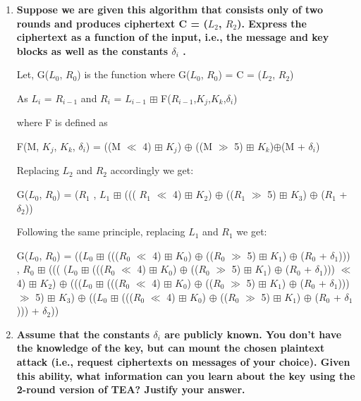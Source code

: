 \documentclass{article}
\begin{document}
\begin{enumerate}[label=\alph*]
\item \textbf{Suppose we are given this algorithm that consists only of two rounds and produces
ciphertext C = ($L_2$, $R_2$). Express the ciphertext as a function of the input, i.e., the
message and key blocks as well as the constants $\delta_i$ .}

Let, G($L_0$, $R_0$) is the function where
G($L_0$, $R_0$) = C = ($L_2$, $R_2$)

As $L_i$ = $R_{i-1}$ and $R_i$ = $L_{i-1}$ $\boxplus$ F($R_{i-1}$,$K_j$,$K_k$,$\delta_i$)

where F is defined as 

F(M, $K_j$, $K_k$, $\delta_i$) = ((M $\ll$ 4) $\boxplus$ $K_j$) $\oplus$ ((M $\gg$ 5) $\boxplus$ $K_k$)$\oplus$(M + $\delta_i$)

Replacing $L_2$ and $R_2$ accordingly we get:


G($L_0$, $R_0$) = ($R_1$ , $L_1$ $\boxplus$ ((( $R_1$ $\ll$ 4) $\boxplus$ $K_2$) $\oplus$ (($R_1$ $\gg$ 5) $\boxplus$ $K_3$) $\oplus$ ($R_1$ + $\delta_2$))

Following the same principle, replacing $L_1$ and $R_1$ we get:

G($L_0$, $R_0$) = (($L_0$ $\boxplus$ ((($R_0$ $\ll$ 4) $\boxplus$ $K_0$) $\oplus$ (($R_0$ $\gg$ 5) $\boxplus$ $K_1$) $\oplus$ ($R_0$ + $\delta_1$))) , $R_0$ $\boxplus$ ((( ($L_0$ $\boxplus$ ((($R_0$ $\ll$ 4) $\boxplus$ $K_0$) $\oplus$ (($R_0$ $\gg$ 5) $\boxplus$ $K_1$) $\oplus$ ($R_0$ + $\delta_1$))) $\ll$ 4) $\boxplus$ $K_2$) $\oplus$ ((($L_0$ $\boxplus$ ((($R_0$ $\ll$ 4) $\boxplus$ $K_0$) $\oplus$ (($R_0$ $\gg$ 5) $\boxplus$ $K_1$) $\oplus$ ($R_0$ + $\delta_1$))) $\gg$ 5) $\boxplus$ $K_3$) $\oplus$ (($L_0$ $\boxplus$ ((($R_0$ $\ll$ 4) $\boxplus$ $K_0$) $\oplus$ (($R_0$ $\gg$ 5) $\boxplus$ $K_1$) $\oplus$ ($R_0$ + $\delta_1$))) + $\delta_2$))



\item \textbf{Assume that the constants $\delta_i$ are publicly known. You don’t have the knowledge of the
key, but can mount the chosen plaintext attack (i.e., request ciphertexts on messages of
your choice). Given this ability, what information can you learn about the key using the
2-round version of TEA? Justify your answer.}



\end{enumerate}
\end{document}
